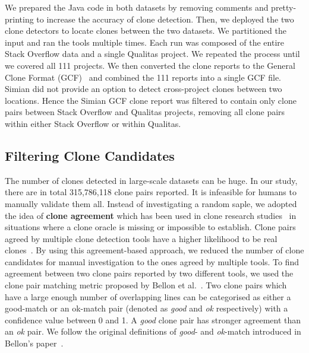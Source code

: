 \documentclass[sigconf,review, anonymous]{acmart}
\begin{document}
We prepared the Java code in both datasets by removing comments and
pretty-printing to increase the accuracy of clone detection. Then, we
deployed the two clone detectors to locate clones between the two
datasets.  We partitioned the input and ran the tools multiple
times. Each run was composed of the entire Stack Overflow data and a
single Qualitas project. We repeated the process until we covered all
111 projects.  We then converted the clone reports to the General
Clone Format (GCF)~\cite{Wang2013} and combined the 111 reports into a
single GCF file.  Simian did not provide an option to detect
cross-project clones between two locations. Hence the Simian GCF clone
report was filtered to contain only clone pairs between Stack Overflow
and Qualitas projects, removing all clone pairs within either Stack
Overflow or within Qualitas. 

\subsection{Filtering Clone Candidates}

The number of clones detected in large-scale datasets can be huge. In
our study, there are in total 315,786,118 clone pairs reported. It is
infeasible for humans to manually validate them all. Instead of
investigating a random saple, we adopted the idea of \textbf{clone
  agreement} which has been used in clone research
studies~\cite{Funaro2010, Wang2013,cr2016ssbse} in situations where a
clone oracle is missing or impossible to establish. Clone pairs agreed
by multiple clone detection tools have a higher likelihood to be real
clones~\cite{cr2016ssbse}. By using this agreement-based approach, we
reduced the number of clone candidates for manual investigation to the
ones agreed by multiple tools. To find agreement between two clone
pairs reported by two different tools, we used the clone pair matching
metric proposed by Bellon et al.~\cite{Bellon2007}. Two clone pairs
which have a large enough number of overlapping lines can be
categorised as either a good-match or an ok-match pair (denoted as
\textit{good} and \textit{ok} respectively) with a confidence value
between 0 and 1. A \textit{good} clone pair has stronger agreement
than an \textit{ok} pair. We follow the original definitions of
\textit{good}- and \textit{ok}-match introduced in Bellon's
paper~\cite{Bellon2007}.
\end{document}
